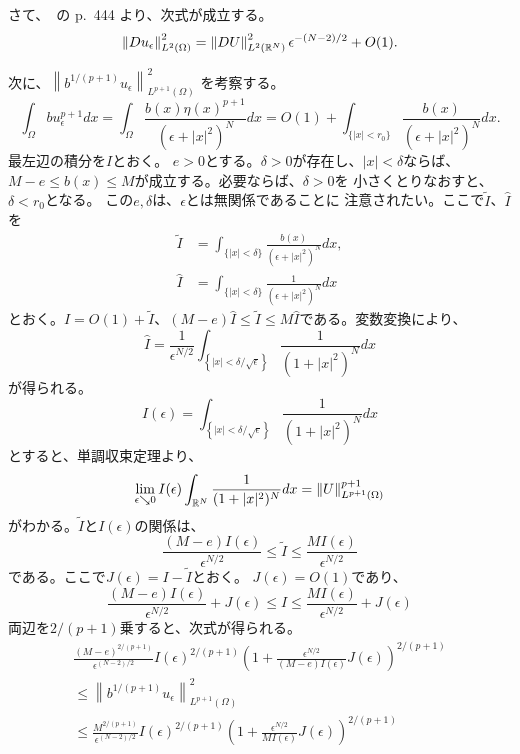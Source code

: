 さて、\cite{MR709644}~の p.~444 より、次式が成立する。
\begin{equation}
 \left\| Du_\epsilon \right\|_{L^2(\Omega)}^2 
  = \left\| DU \right\|_{L^2(\mathbb{R}^N)}^2 \epsilon^{-(N-2)/2} + O(1).
  \label{eq:Duepsilon}
\end{equation}

次に、$\left\| b^{1/(p+1)} u_\epsilon \right\|_{L^{p+1}(\Omega)}^2$
を考察する。
\[
 \int_\Omega b u_{\epsilon}^{p+1} dx
 = \int_\Omega \frac{b(x) \eta(x)^{p+1}}{(\epsilon + \lvert x
 \rvert^2)^N} dx 
 = O(1) + \int_{ \{ \lvert x \rvert < r_0 \} } 
 \frac{b(x)}{(\epsilon + \lvert x
 \rvert^2)^N} dx.
\]
最左辺の積分を$I$とおく。
$e > 0$とする。$\delta > 0$が存在し、$\lvert x \rvert < \delta$ならば、
$M - e \leq b(x) \leq M$が成立する。必要ならば、$\delta > 0$を
小さくとりなおすと、$\delta < r_0$となる。
この$e, \delta$は、$\epsilon$とは無関係であることに
注意されたい。ここで$\tilde{I}$、$\hat{I}$を
\begin{align*}
 \tilde{I} &= \int_{ \{ \lvert x \rvert < \delta \} } 
 \frac{b(x)}{(\epsilon + \lvert x
 \rvert^2)^N} dx, \\
 \hat{I} &= \int_{ \{ \lvert x \rvert < \delta \} } 
 \frac{1}{(\epsilon + \lvert x
 \rvert^2)^N} dx
\end{align*}
とおく。$I = O(1) + \tilde{I}$、$(M - e) \hat{I}
 \leq \tilde{I} \leq M \hat{I}$である。変数変換により、
\[
 \hat{I} 
 = \frac{1}{\epsilon^{N/2}} \int_{ \left\{ \lvert x \rvert <
 \delta/\sqrt{\epsilon} \right\}} \frac{1}{(1 + \lvert x
 \rvert^2)^N}dx
\]
が得られる。
\[
 I(\epsilon) = \int_{ \left\{ \lvert x \rvert <
 \delta/\sqrt{\epsilon} \right\}} \frac{1}{(1 + \lvert x
 \rvert^2)^N} dx
\]
とすると、単調収束定理より、
\[
 \lim_{\epsilon \searrow 0} I(\epsilon)
 \int_{\mathbb{R}^N} \frac{1}{(1 + \lvert x
 \rvert^2)^N} dx = \left\| U \right\|_{L^{p+1}(\Omega)}^{p+1}
\]
がわかる。$\tilde{I}$と$I(\epsilon)$の関係は、
\[
 \frac{(M - e)I(\epsilon)}{\epsilon^{N/2}} \leq \tilde{I} \leq \frac{M
 I(\epsilon)}{\epsilon^{N/2}}
\]
である。ここで$J(\epsilon) = I - \tilde{I}$とおく。
$J(\epsilon) = O(1)$であり、
\[
 \frac{(M - e)I(\epsilon)}{\epsilon^{N/2}} + J(\epsilon)
 \leq I \leq \frac{M
 I(\epsilon)}{\epsilon^{N/2}} + J(\epsilon)
\]
両辺を$2/(p+1)$乗すると、次式が得られる。
\begin{multline}
 \frac{(M -e)^{2/(p+1)}}{\epsilon^{(N-2)/2}} I(\epsilon)^{2/(p+1)}
 \left( 1 + \frac{\epsilon^{N/2}}{(M-e)I(\epsilon)} J(\epsilon)
 \right)^{2/(p+1)}  \\  \leq  \left\| b^{1/(p+1)} u_\epsilon
 \right\|^2_{L^{p+1}(\Omega)}  \\ \leq
 \frac{M^{2/(p+1)}}{\epsilon^{(N-2)/2}} I(\epsilon)^{2/(p+1)}
 \left( 1 + \frac{\epsilon^{N/2}}{MI(\epsilon)} J(\epsilon)
 \right)^{2/(p+1)} \label{eq:2/p+1pow} 
\end{multline}
